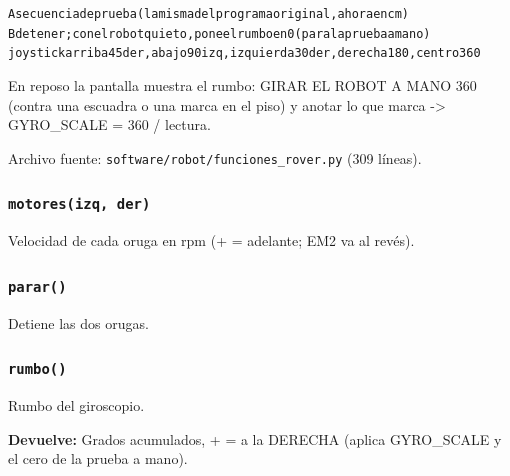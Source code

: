 {\small\begin{alltt}
A          secuencia de prueba (la misma del programa original, ahora en cm)
B          detener; con el robot quieto, pone el rumbo en 0 (para la prueba a mano)
joystick   arriba 45\textdegree{} der, abajo 90\textdegree{} izq, izquierda 30\textdegree{} der, derecha 180\textdegree{}, centro 360\textdegree{}
\end{alltt}}
En reposo la pantalla muestra el rumbo: GIRAR EL ROBOT A MANO 360\textdegree{} (contra una escuadra o una marca en el piso) y anotar lo que marca -> GYRO\_SCALE = 360 / lectura.

\noindent Archivo fuente: \texttt{software/robot/funciones\_\allowbreak{}rover.py} (309 l\'ineas).

\subsubsection{\texttt{motores(izq, der)}}\label{fn:funciones_rover:motores}
\noindent Velocidad de cada oruga en rpm (+ = adelante; EM2 va al revés).

\par{}\par\smallskip

\subsubsection{\texttt{parar()}}\label{fn:funciones_rover:parar}
\noindent Detiene las dos orugas.


\subsubsection{\texttt{rumbo()}}\label{fn:funciones_rover:rumbo}
\noindent Rumbo del giroscopio.

\noindent\textbf{Devuelve:} Grados acumulados, + = a la DERECHA (aplica GYRO\_SCALE y el cero de la prueba a mano).\par

